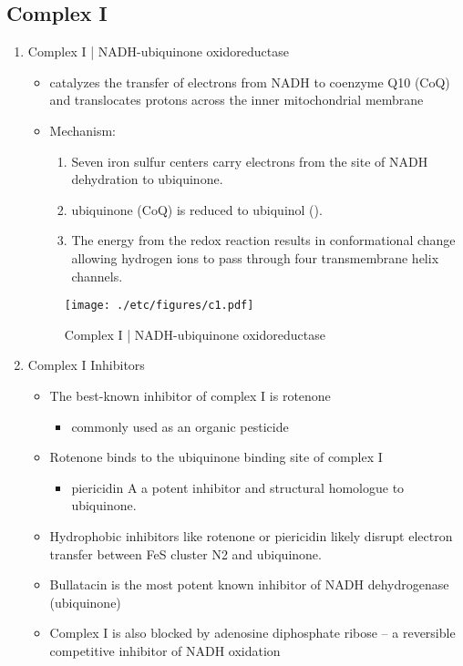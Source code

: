 \documentclass{scrartcl}
\begin{document}
\subsection{Complex I}
\label{sec:org0ee1336}
\begin{enumerate}
\item Complex I | NADH-ubiquinone oxidoreductase
\label{sec:orgcf5a72a}
\begin{itemize}
\item catalyzes the transfer of electrons from NADH to coenzyme Q10
(CoQ) and translocates protons across the inner mitochondrial
membrane
\end{itemize}

{\small{}}

\begin{itemize}
\item Mechanism: 
\begin{enumerate}
\item Seven iron sulfur centers carry electrons from the site of NADH
dehydration to ubiquinone.

\item ubiquinone (CoQ) is reduced to ubiquinol ().

\item The energy from the redox reaction results in conformational
change allowing hydrogen ions to pass through four transmembrane
helix channels.
\end{enumerate}
\end{itemize}

\begin{figure}[htbp]
\centering
\texttt{[image: ./etc/figures/c1.pdf]}
\caption[c1]{\label{fig:org84c3a39}
Complex I | NADH-ubiquinone oxidoreductase}
\end{figure}

\item Complex I Inhibitors
\label{sec:orge555f2a}
\begin{itemize}
\item The best-known inhibitor of complex I is rotenone
\begin{itemize}
\item commonly used as an organic pesticide
\end{itemize}
\item Rotenone binds to the ubiquinone binding site of complex I
\begin{itemize}
\item piericidin A a potent inhibitor and structural homologue to ubiquinone.
\end{itemize}
\item Hydrophobic inhibitors like rotenone or piericidin likely disrupt electron transfer between FeS cluster N2 and ubiquinone.
\item Bullatacin is the most potent known inhibitor of NADH dehydrogenase (ubiquinone)
\item Complex I is also blocked by adenosine diphosphate ribose – a reversible competitive inhibitor of NADH oxidation
\end{itemize}
\end{enumerate}
\end{document}
